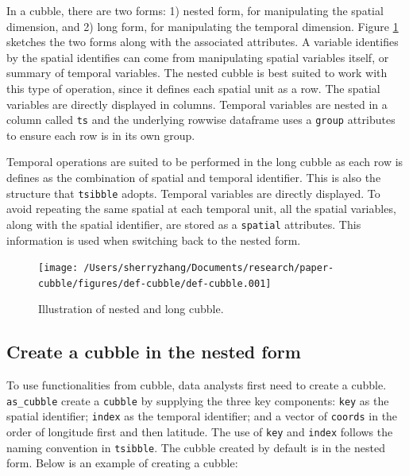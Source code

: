 \documentclass[
]{jss}
\begin{document}
In a cubble, there are two forms: 1) nested form, for manipulating the
spatial dimension, and 2) long form, for manipulating the temporal
dimension. Figure \ref{fig:def-cubble} sketches the two forms along with
the associated attributes. A variable identifies by the spatial
identifies can come from manipulating spatial variables itself, or
summary of temporal variables. The nested cubble is best suited to work
with this type of operation, since it defines each spatial unit as a
row. The spatial variables are directly displayed in columns. Temporal
variables are nested in a column called \texttt{ts} and the underlying
rowwise dataframe uses a \texttt{group} attributes to ensure each row is
in its own group.

Temporal operations are suited to be performed in the long cubble as
each row is defines as the combination of spatial and temporal
identifier. This is also the structure that \texttt{tsibble} adopts.
Temporal variables are directly displayed. To avoid repeating the same
spatial at each temporal unit, all the spatial variables, along with the
spatial identifier, are stored as a \texttt{spatial} attributes. This
information is used when switching back to the nested form.

\begin{CodeChunk}
\begin{figure}

{\centering \texttt{[image: /Users/sherryzhang/Documents/research/paper-cubble/figures/def-cubble/def-cubble.001]} 

}

\caption[Illustration of nested and long cubble]{Illustration of nested and long cubble.}\label{fig:def-cubble}
\end{figure}
\end{CodeChunk}

\newpage

\hypertarget{create-a-cubble-in-the-nested-form}{%
\subsection{Create a cubble in the nested
form}\label{create-a-cubble-in-the-nested-form}}

To use functionalities from cubble, data analysts first need to create a
cubble. \texttt{as\_cubble} create a \texttt{cubble} by supplying the
three key components: \texttt{key} as the spatial identifier;
\texttt{index} as the temporal identifier; and a vector of
\texttt{coords} in the order of longitude first and then latitude. The
use of \texttt{key} and \texttt{index} follows the naming convention in
\texttt{tsibble}. The cubble created by default is in the nested form.
Below is an example of creating a cubble: \newline
\end{document}
